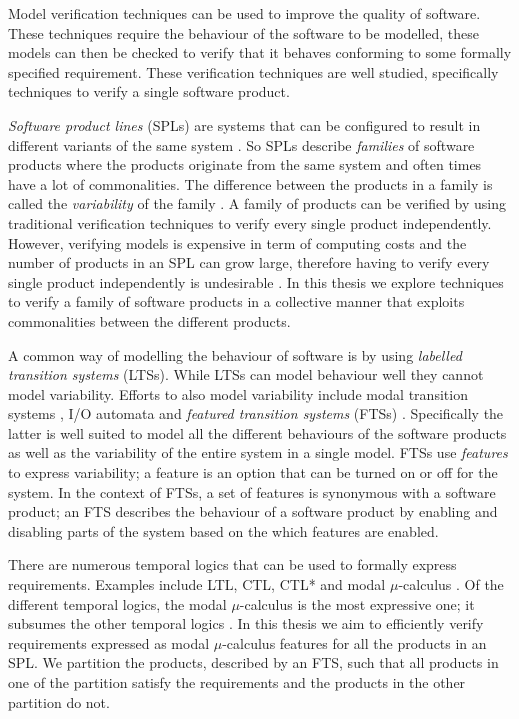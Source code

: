 Model verification techniques can be used to improve the quality of software. These techniques require the behaviour of the software to be modelled, these models can then be checked to verify that it behaves conforming to some formally specified requirement. These verification techniques are well studied, specifically techniques to verify a single software product.

\textit{Software product lines} (SPLs) are systems that can be configured to result in different variants of the same system \cite{ClementsSoftwareProduct2001,SPLsFoundationAndTechniques}. So SPLs describe \textit{families} of software products where the products originate from the same system and often times have a lot of commonalities. The difference between the products in a family is called the \textit{variability} of the family \cite{OnTheNotionOfVariability}. A family of products can be verified by using traditional verification techniques to verify every single product independently. However, verifying models is expensive in term of computing costs and the number of products in an SPL can grow large, therefore having to verify every single product independently is undesirable \cite{CheckingLotsOfSystems}. In this thesis we explore techniques to verify a family of software products in a collective manner that exploits commonalities between the different products.

A common way of modelling the behaviour of software is by using \textit{labelled transition systems} (LTSs). \cite{Groote} While LTSs can model behaviour well they cannot model variability. Efforts to also model variability include  modal transition systems \cite{ModalTS1,ModalTS2,ModalTS3}, I/O automata \cite{ModalIOAutomata,ModelCheckingDomainArtifacts} and \textit{featured transition systems} (FTSs) \cite{CheckingLotsOfSystems,FTSLTL}. Specifically the latter is well suited to model all the different behaviours of the software products as well as the variability of the entire system in a single model. FTSs use \textit{features} to express variability; a feature is an option that can be turned on or off for the system. In the context of FTSs, a set of features is synonymous with a software product; an FTS describes the behaviour of a software product by enabling and disabling parts of the system based on the which features are enabled.

There are numerous temporal logics that can be used to formally express requirements. Examples include LTL, CTL, CTL* and modal $\mu$-calculus \cite{LTL,PrinciplesOfModelChecking,Groote}. Of the different temporal logics, the modal $\mu$-calculus is the most expressive one; it subsumes the other temporal logics \cite{MuCalculusSubsumes}. In this thesis we aim to efficiently verify requirements expressed as modal $\mu$-calculus features for all the products in an SPL. We partition the products, described by an FTS, such that all products in one of the partition satisfy the requirements and the products in the other partition do not. 

